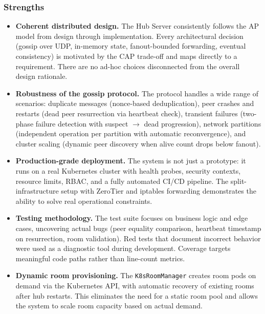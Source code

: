 \subsubsection{Strengths}

\begin{itemize}
  \item \textbf{Coherent distributed design.} The Hub Server consistently follows the AP model from design through implementation. Every architectural decision (gossip over UDP, in-memory state, fanout-bounded forwarding, eventual consistency) is motivated by the CAP trade-off and maps directly to a requirement. There are no ad-hoc choices disconnected from the overall design rationale.

  \item \textbf{Robustness of the gossip protocol.} The protocol handles a wide range of scenarios: duplicate messages (nonce-based deduplication), peer crashes and restarts (dead peer resurrection via heartbeat check), transient failures (two-phase failure detection with suspect $\rightarrow$ dead progression), network partitions (independent operation per partition with automatic reconvergence), and cluster scaling (dynamic peer discovery when alive count drops below fanout).

  \item \textbf{Production-grade deployment.} The system is not just a prototype: it runs on a real Kubernetes cluster with health probes, security contexts, resource limits, RBAC, and a fully automated CI/CD pipeline. The split-infrastructure setup with ZeroTier and iptables forwarding demonstrates the ability to solve real operational constraints.

  \item \textbf{Testing methodology.} The test suite focuses on business logic and edge cases, uncovering actual bugs (peer equality comparison, heartbeat timestamp on resurrection, room validation). Red tests that document incorrect behavior were used as a diagnostic tool during development. Coverage targets meaningful code paths rather than line-count metrics.

  \item \textbf{Dynamic room provisioning.} The \texttt{K8sRoomManager} creates room pods on demand via the Kubernetes API, with automatic recovery of existing rooms after hub restarts. This eliminates the need for a static room pool and allows the system to scale room capacity based on actual demand.
\end{itemize}

